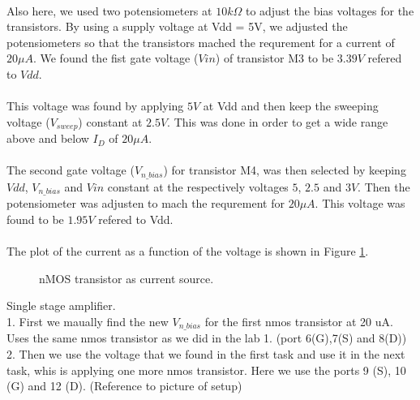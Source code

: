 \documentclass[a4paper,english,11pt]{article}
\begin{document}
\\
Also here, we used two potensiometers at $10k\Omega$ to adjust the bias voltages for the transistors. By using a supply voltage at Vdd = 5V, we adjusted the potensiometers
so that the transistors mached the requrement for a current of $20 {\mu}A$. We found the fist gate voltage ($Vin$) of transistor M3 to be $3.39 V$ refered to $Vdd$.\\ 
\\
This voltage was found by applying $5 V$ at Vdd and then keep the sweeping voltage ($V_{sweep}$) constant at $2.5 V$. This was done in order to get a wide range above
and below $I_D$ of $20 {\mu}A$.\\
\\
The second gate voltage ($V_{n\_bias}$) for transistor M4, was then selected by keeping $Vdd$, $V_{n\_bias}$ and $Vin$ constant at the respectively voltages $5$, $2.5$ and $3 V$.
Then the potensiometer was adjusten to mach the requrement for $20 {\mu}A$. This voltage was found to be $1.95 V$ refered to Vdd.\\
\\
The plot of the current as a function of the voltage is shown in Figure \ref{fig:task4_plot}.\\ 

\begin{figure}[htbp]
 \centering
  \caption{nMOS transistor as current source.}
  \label{fig:task4_plot}	
\end{figure}

Single stage amplifier.
\\
1. First we maually find the new $V_{n\_bias}$ for the first nmos transistor at 20 uA.\\
Uses the same nmos transistor as we did in the lab 1. (port 6(G),7(S) and 8(D))\\
2. Then we use the voltage that we found in the first task and use it in the next task, whis is applying one more nmos transistor. Here we
use the ports 9 (S), 10 (G) and 12 (D). (Reference to picture of setup)
\end{document}
